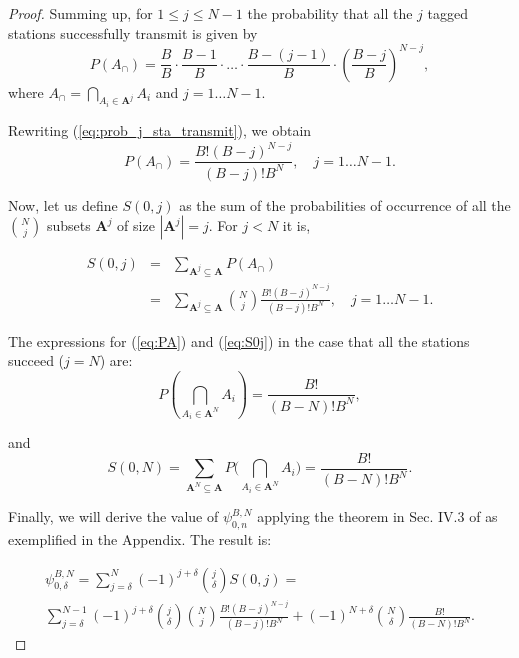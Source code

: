 \documentclass[journal]{IEEEtran}
\begin{document}
\begin{proof}
Summing up, for $1 \leq j \leq N-1$ the probability that all the $j$ tagged stations successfully transmit is given by
\begin{equation}
\label{eq:prob_j_sta_transmit}
P\left( A_\cap \right) = \frac{B}{B} \cdot \frac{B-1}{B} \cdot \dots \cdot \frac{B-(j-1)}{B} \cdot \left( \frac{B-j}{B} \right)^{N-j},
\end{equation}
where $A_\cap=\bigcap_{ A_i \in \mathbf{A}^j}A_i$ and $j=1\dots N-1$.

Rewriting (\ref{eq:prob_j_sta_transmit}), we obtain
\begin{equation}
\label{eq:PA}
P\left( A_\cap \right) = \frac{B! (B-j)^{N-j}}{(B-j)! B^N},
\quad j=1\dots N-1.
\end{equation}

Now, let us define $S(0,j)$ as the sum of the probabilities of occurrence of all the $\binom{N}{j}$ subsets $\mathbf{A}^j$ of size $|\mathbf{A}^j|=j$. For $j < N$ it is, 

\begin{eqnarray}
\label{eq:S0j}
S(0,j) & {}={}  & \sum_{\scriptstyle \mathbf{A}^j\subseteq\mathbf{A}} P\left( A_\cap \right) \\
&{}={}& \sum_{\scriptstyle \mathbf{A}^j\subseteq\mathbf{A}} \binom{N}{j}\frac{B! (B-j)^{N-j}}{(B-j)! B^N},
\quad j=1 \dots N-1. \nonumber
\end{eqnarray}

The expressions for (\ref{eq:PA}) and (\ref{eq:S0j}) in the case that all the stations succeed ($j=N$) are:
\begin{equation}
P\left( \bigcap_{ A_i \in \mathbf{A}^N } A_i \right) = \frac{B!}{(B-N)! B^N}
,
\end{equation}

and
\begin{equation}
S(0,N)=\sum_{\scriptstyle \mathbf{A}^N\subseteq\mathbf{A}} P\biggl(\bigcap_{A_i\in \mathbf{A}^N} A_i \biggr) 
=\frac{B!}{(B-N)! B^N}.
\end{equation}



Finally, we will derive the value of $\psi_{0,n}^{B,N}$ applying the theorem in Sec. IV.3 of \cite{feller1968ipt} as exemplified in the Appendix.
The result is:

\begin{equation}
\begin{split}
\psi^{B,N}_{0,\delta} = \sum_{j=\delta}^{N} (-1)^{j+\delta}\binom{j}{\delta} S(0,j)= \\
\sum_{j=\delta}^{N-1} (-1)^{j+\delta}\binom{j}{\delta} \binom{N}{j}\frac{B! (B-j)^{N-j}}{(B-j)! B^N}
+ (-1)^{N+\delta}\binom{N}{\delta}\frac{B!}{(B-N)! B^N}.
\end{split}
\label{eq:psi_zero}
\end{equation}


\end{proof}
\end{document}
